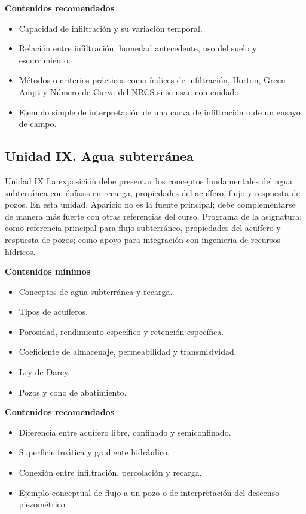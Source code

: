 \documentclass[11pt]{article}
\begin{document}
\textbf{Contenidos recomendados}
\begin{itemize}
\item Capacidad de infiltración y su variación temporal.
\item Relación entre infiltración, humedad antecedente, uso del suelo y escurrimiento.
\item Métodos o criterios prácticos como índices de infiltración, Horton, Green--Ampt y Número de Curva del NRCS si se usan con cuidado.
\item Ejemplo simple de interpretación de una curva de infiltración o de un ensayo de campo.
\end{itemize}

\subsection{Unidad IX. Agua subterránea}
\unitbox
{Unidad IX}
{La exposición debe presentar los conceptos fundamentales del agua subterránea con énfasis en recarga, propiedades del acuífero, flujo y respuesta de pozos. En esta unidad, Aparicio no es la fuente principal; debe complementarse de manera más fuerte con otras referencias del curso.}
{Programa de la asignatura; \textcite{freeze1979} como referencia principal para flujo subterráneo, propiedades del acuífero y respuesta de pozos; \textcite{mays2011} como apoyo para integración con ingeniería de recursos hídricos.}

\textbf{Contenidos mínimos}
\begin{itemize}
\item Conceptos de agua subterránea y recarga.
\item Tipos de acuíferos.
\item Porosidad, rendimiento específico y retención específica.
\item Coeficiente de almacenaje, permeabilidad y transmisividad.
\item Ley de Darcy.
\item Pozos y cono de abatimiento.
\end{itemize}

\textbf{Contenidos recomendados}
\begin{itemize}
\item Diferencia entre acuífero libre, confinado y semiconfinado.
\item Superficie freática y gradiente hidráulico.
\item Conexión entre infiltración, percolación y recarga.
\item Ejemplo conceptual de flujo a un pozo o de interpretación del descenso piezométrico.
\end{itemize}
\end{document}
